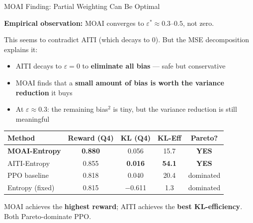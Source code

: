 \documentclass[aspectratio=169,10pt]{beamer}
\begin{document}
\begin{frame}{MOAI Finding: Partial Weighting Can Be Optimal}


\textbf{Empirical observation:} MOAI converges to $\varepsilon^* \approx 0.3$--$0.5$, not zero.

\vspace{0.2cm}
This seems to contradict AITI (which decays to 0). But the MSE decomposition explains it:

\begin{itemize}
    \item AITI decays to $\varepsilon = 0$ to \textbf{eliminate all bias} --- safe but conservative
    \item MOAI finds that a \textbf{small amount of bias is worth the variance reduction} it buys
    \item At $\varepsilon \approx 0.3$: the remaining bias$^2$ is tiny, but the variance reduction is still meaningful
\end{itemize}

\vspace{0.3cm}
\begin{table}
\begin{tabular}{lcccc}
\toprule
Method & Reward (Q4) & KL (Q4) & KL-Eff & Pareto? \\
\midrule
\textbf{MOAI-Entropy} & \textbf{0.880} & 0.056 & 15.7 & \textcolor{good}{\textbf{YES}} \\
AITI-Entropy & 0.855 & \textbf{0.016} & \textbf{54.1} & \textcolor{good}{\textbf{YES}} \\
PPO baseline & 0.818 & 0.040 & 20.4 & dominated \\
Entropy (fixed) & 0.815 & $-$0.611 & 1.3 & dominated \\
\bottomrule
\end{tabular}
\end{table}

MOAI achieves the \textbf{highest reward}; AITI achieves the \textbf{best KL-efficiency}. Both Pareto-dominate PPO.

\end{frame}
\end{document}
